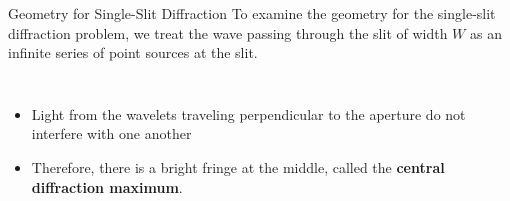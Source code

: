 \documentclass[compress,aspectratio=169]{beamer}
\begin{document}
\begin{frame}{Geometry for Single-Slit Diffraction}
  To examine the geometry for the single-slit diffraction problem, we treat
  the wave passing through the slit of width $W$ as an infinite series of point
  sources at the slit.
  
  \vspace{.2in}\begin{columns}
    
    \begin{itemize}
    \item Light from the wavelets traveling perpendicular to the aperture do
      not interfere with one another
    \item Therefore, there is a bright fringe at the middle, called the
      \textbf{central diffraction maximum}.
    \end{itemize}
  \end{columns}
\end{frame}
\end{document}
